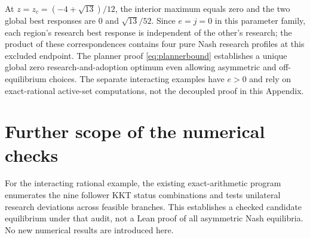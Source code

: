\documentclass[11pt]{article}
\begin{document}
At $z=z_c=(-4+\sqrt{13})/12$, the interior maximum equals zero and the two global best responses are $0$ and $\sqrt{13}/52$. Since $e=j=0$ in this parameter family, each region's research best response is independent of the other's research; the product of these correspondences contains four pure Nash research profiles at this excluded endpoint. The planner proof \eqref{eq:plannerbound} establishes a unique global zero research-and-adoption optimum even allowing asymmetric and off-equilibrium choices. The separate interacting examples have $e>0$ and rely on exact-rational active-set computations, not the decoupled proof in this Appendix.


\section{Further scope of the numerical checks}
For the interacting rational example, the existing exact-arithmetic program enumerates the nine follower KKT status combinations and tests unilateral research deviations across feasible branches. This establishes a checked candidate equilibrium under that audit, not a Lean proof of all asymmetric Nash equilibria. No new numerical results are introduced here.



\end{document}
